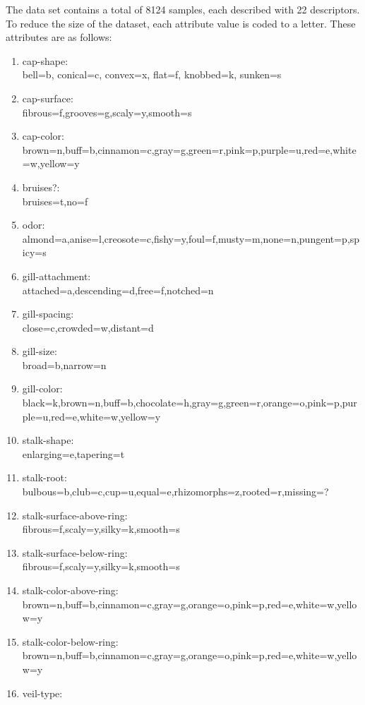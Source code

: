 \documentclass[11pt]{article}
\begin{document}
The data set contains a total of 8124 samples, each described with 22
descriptors. To reduce the size of the dataset, each attribute value is
coded to a letter. These attributes are as follows:
\begin{enumerate}
	\item cap-shape:\\
	bell=b, conical=c, convex=x, flat=f, knobbed=k, sunken=s
	\item cap-surface: \\
	fibrous=f,grooves=g,scaly=y,smooth=s
	\item cap-color: \\
	brown=n,buff=b,cinnamon=c,gray=g,green=r,pink=p,purple=u,red=e,white=w,yellow=y
	\item bruises?: \\
	bruises=t,no=f
	\item odor: \\
	almond=a,anise=l,creosote=c,fishy=y,foul=f,musty=m,none=n,pungent=p,spicy=s
	\item gill-attachment: \\
	attached=a,descending=d,free=f,notched=n
	\item gill-spacing: \\
	close=c,crowded=w,distant=d
	\item gill-size: \\
	broad=b,narrow=n
	\item gill-color: \\
	black=k,brown=n,buff=b,chocolate=h,gray=g,green=r,orange=o,pink=p,purple=u,red=e,white=w,yellow=y
	\item stalk-shape: \\
	 enlarging=e,tapering=t
	\item stalk-root: \\
	bulbous=b,club=c,cup=u,equal=e,rhizomorphs=z,rooted=r,missing=?
	\item stalk-surface-above-ring: \\
	fibrous=f,scaly=y,silky=k,smooth=s
	\item stalk-surface-below-ring: \\
	fibrous=f,scaly=y,silky=k,smooth=s
	\item stalk-color-above-ring: \\
	brown=n,buff=b,cinnamon=c,gray=g,orange=o,pink=p,red=e,white=w,yellow=y
	\item stalk-color-below-ring: \\
	brown=n,buff=b,cinnamon=c,gray=g,orange=o,pink=p,red=e,white=w,yellow=y
	\item veil-type: \\

\end{enumerate}
\end{document}
